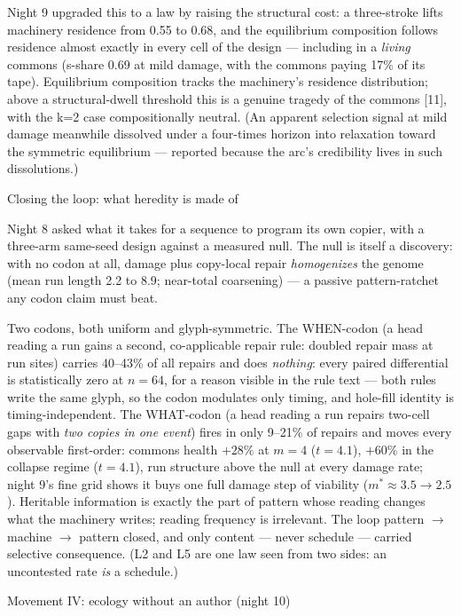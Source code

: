 Night 9 upgraded this to a law by raising the structural cost: a
three-stroke  lifts machinery residence from 0.55 to 0.68, and
the equilibrium composition follows residence almost exactly in
every cell of the design --- including in a {\it living} commons
(s-share 0.69 at mild damage, with the commons paying 17\% of its
tape).  Equilibrium composition tracks the machinery's
residence distribution; above a structural-dwell threshold this is
a genuine tragedy of the commons [11], with the k=2 case
compositionally neutral. (An apparent selection signal at mild
damage meanwhile dissolved under a four-times horizon into
relaxation toward the symmetric equilibrium --- reported because
the arc's credibility lives in such dissolutions.)

\secc Closing the loop: what heredity is made of

Night 8 asked what it takes for a sequence to program its own
copier, with a three-arm same-seed design against a measured null.
The null is itself a discovery: with no codon at all, damage plus
copy-local repair {\it homogenizes} the genome (mean run length 2.2
to 8.9; near-total coarsening) --- a passive pattern-ratchet any
codon claim must beat.

Two codons, both uniform and glyph-symmetric. The WHEN-codon (a
head reading a run gains a second, co-applicable repair rule:
doubled repair mass at run sites) carries 40--43\% of all repairs
and does {\it nothing}: every paired differential is statistically
zero at $n{=}64$, for a reason visible in the rule text --- both
rules write the same glyph, so the codon modulates only timing, and
hole-fill identity is timing-independent. The WHAT-codon (a head
reading a run repairs two-cell gaps with {\it two copies in one
event}) fires in only 9--21\% of repairs and moves every observable
first-order: commons health $+28\%$ at $m{=}4$ ($t{=}4.1$), $+60\%$
in the collapse regime ($t{=}4.1$), run structure above the null at
every damage rate; night 9's fine grid shows it buys one full
damage step of viability ($m^*\!\approx 3.5 \to 2.5$).
 Heritable information is exactly the part of pattern
whose reading changes what the machinery writes; reading frequency
is irrelevant. The loop pattern $\to$ machine $\to$ pattern closed,
and only content --- never schedule --- carried selective
consequence. (L2 and L5 are one law seen from two sides: an
uncontested rate {\it is} a schedule.)

\sec Movement IV: ecology without an author (night 10)

